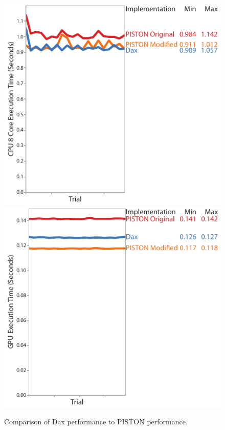 \documentclass[conference]{IEEEtran}
\begin{document}
\begin{figure}
  \centering
  \includegraphics{images/PistonCompareOpenMP}
  \qquad
  \includegraphics{images/PistonCompareCUDA}
  \caption{Comparison of Dax performance to PISTON performance.}
  \label{fig:PistonCompare}
\end{figure}
\end{document}
